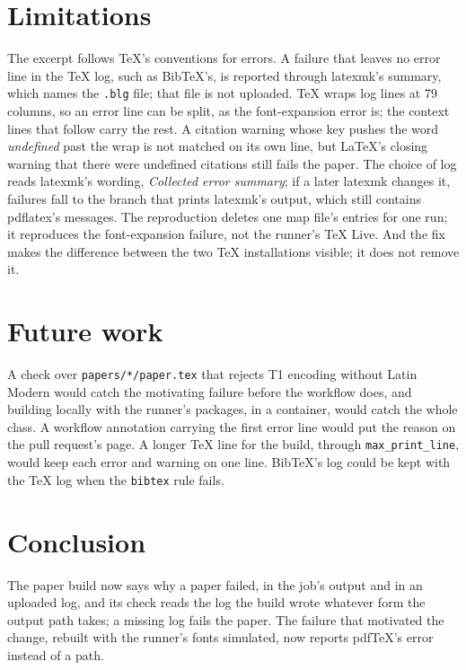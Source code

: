 \documentclass[11pt]{article}
\theoremstyle{plain}
\theoremstyle{definition}
\newcommand{\code}[1]{\texttt{#1}}
\begin{document}
\section{Limitations}
The excerpt follows TeX's conventions for errors. A failure that leaves no error line in the TeX
log, such as BibTeX's, is reported through latexmk's summary, which names the \code{.blg} file;
that file is not uploaded. TeX wraps log lines at 79 columns, so an error line can be split, as
the font-expansion error is; the context lines that follow carry the rest. A citation warning
whose key pushes the word \emph{undefined} past the wrap is not matched on its own line, but
LaTeX's closing warning that there were undefined citations still fails the paper. The choice of
log reads latexmk's wording, \emph{Collected error summary}; if a later latexmk changes it,
failures fall to the branch that prints latexmk's output, which still contains pdflatex's
messages. The reproduction deletes one map file's entries for one run; it reproduces the
font-expansion failure, not the runner's TeX Live. And the fix makes the difference between the two
TeX installations visible; it does not remove it.

\section{Future work}
A check over \code{papers/*/paper.tex} that rejects T1 encoding without Latin Modern would catch
the motivating failure before the workflow does, and building locally with the runner's packages,
in a container, would catch the whole class. A workflow annotation carrying the first error line
would put the reason on the pull request's page. A longer TeX line for the build, through
\code{max\_print\_line}, would keep each error and warning on one line. BibTeX's log could be kept
with the TeX log when the \code{bibtex} rule fails.

\section{Conclusion}
The paper build now says why a paper failed, in the job's output and in an uploaded log, and its
check reads the log the build wrote whatever form the output path takes; a missing log fails the
paper. The failure that motivated the change, rebuilt with the runner's fonts simulated, now
reports pdfTeX's error instead of a path.



\end{document}
